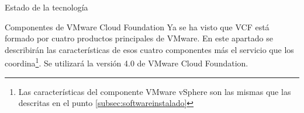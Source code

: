 \begin{section}{Estado de la tecnología}
\begin{subsection}{Componentes de VMware Cloud Foundation \cite{componentesCloudFound}}
Ya se ha visto que VCF está formado por cuatro productos principales de VMware. En este apartado se describirán las características de esos cuatro componentes más el servicio que los coordina\footnote{Las características del componente VMware vSphere son las mismas que las descritas en el punto \ref*{subsec:softwareinstalado}}. Se utilizará la versión 4.0 de VMware Cloud Foundation.

\end{subsection}
\end{section}
